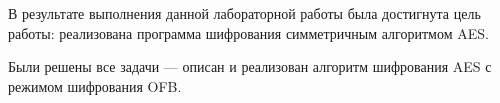 \Conclusion %

В результате выполнения данной лабораторной работы была достигнута цель работы:  реализована программа шифрования симметричным алгоритмом AES.

Были решены все задачи --- описан и реализован алгоритм шифрования AES с режимом шифрования OFB.
